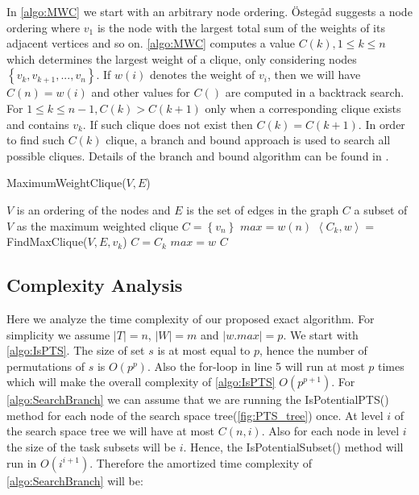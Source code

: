 In \cref{algo:MWC} we start with an arbitrary node ordering. \"{O}steg\r{a}d \cite{Ostergard01} suggests a node ordering where $v_1$ is the node with the largest total sum of the weights of its adjacent vertices and so on. \cref{algo:MWC} computes a value $C(k), 1 \leq k \leq n$ which determines the largest weight of a clique, only considering nodes $\left\{v_k, v_{k+1}, ..., v_n\right\}$. If $w(i)$ denotes the weight of $v_i$, then we will have $C(n) = w(i)$ and other values for $C()$ are computed in a backtrack search. For $1 \leq k \leq n-1, C(k) > C(k+1)$ only when a corresponding clique exists and contains $v_k$. If such clique does not exist then $C(k) = C(k+1)$. In order to find such $C(k)$ clique, a branch and bound approach is used to search all possible cliques. Details of the branch and bound algorithm can be found in \cite{Ostergard01}.

\begin{algorithm}
\caption{MaximumWeightClique($V, E$)}
\label{algo:MWC}
\begin{algorithmic}[1]
\REQUIRE $V$ is an ordering of the nodes and $E$ is the set of edges in the graph
\ENSURE $C$ a subset of $V$ as the maximum weighted clique
\STATE $C = \left\{ v_n \right\}$
\STATE $max = w(n)$
	\STATE $\left\langle C_k, w \right\rangle =$ FindMaxClique($V, E, v_k$)
		\STATE $C = C_k$
		\STATE $max = w$
	\ENDIF
\ENDFOR
\RETURN $C$
\end{algorithmic}
\end{algorithm}

\subsection{Complexity Analysis}
\label{subsec:exactcomplexity}

Here we analyze the time complexity of our proposed exact algorithm. For simplicity we assume $\left\vert T \right\vert = n$, $\left\vert W \right\vert = m$ and $\left\vert w.max \right\vert = p$. We start with \cref{algo:IsPTS}. The size of set $s$ is at most equal to $p$, hence the number of permutations of $s$ is $O(p^p)$. Also the for-loop in line 5 will run at most $p$ times which will make the overall complexity of \cref{algo:IsPTS} $O(p^{p+1})$. For \cref{algo:SearchBranch} we can assume that we are running the IsPotentialPTS() method for each node of the search space tree(\cref{fig:PTS_tree}) once. At level $i$ of the search space tree we will have at most $C(n,i)$. Also for each node in level $i$ the size of the task subsets will be $i$. Hence, the IsPotentialSubset() method will run in $O(i^{i+1})$. Therefore the amortized time complexity of \cref{algo:SearchBranch} will be:

